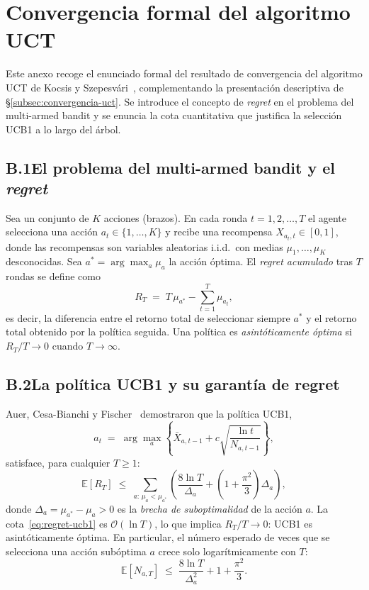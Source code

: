 \section{Convergencia formal del algoritmo UCT}
\label{anexo:kocsis}

Este anexo recoge el enunciado formal del resultado de convergencia del algoritmo UCT de Kocsis y Szepesvári~\cite{kocsis2006}, complementando la presentación descriptiva de §\ref{subsec:convergencia-uct}. Se introduce el concepto de \emph{regret} en el problema del multi-armed bandit y se enuncia la cota cuantitativa que justifica la selección UCB1 a lo largo del árbol.

\subsection*{B.1\quad El problema del multi-armed bandit y el \emph{regret}}

Sea un conjunto de $K$ acciones (brazos). En cada ronda $t = 1, 2, \ldots, T$ el agente selecciona una acción $a_t \in \{1, \ldots, K\}$ y recibe una recompensa $X_{a_t,t} \in [0,1]$, donde las recompensas son variables aleatorias i.i.d.\ con medias $\mu_1, \ldots, \mu_K$ desconocidas. Sea $a^* = \arg\max_a \mu_a$ la acción óptima. El \emph{regret acumulado} tras $T$ rondas se define como
\[
    R_T \;=\; T\,\mu_{a^*} - \sum_{t=1}^{T} \mu_{a_t},
\]
es decir, la diferencia entre el retorno total de seleccionar siempre $a^*$ y el retorno total obtenido por la política seguida. Una política es \emph{asintóticamente óptima} si $R_T/T \to 0$ cuando $T \to \infty$.

\subsection*{B.2\quad La política UCB1 y su garantía de regret}

Auer, Cesa-Bianchi y Fischer~\cite{auer2002} demostraron que la política UCB1,
\[
    a_t \;=\; \arg\max_{a} \left\{ \bar X_{a,t-1} + c\sqrt{\frac{\ln t}{N_{a,t-1}}} \right\},
\]
satisface, para cualquier $T \geq 1$:
\begin{equation}
    \mathbb{E}[R_T] \;\leq\; \sum_{a:\,\mu_a < \mu_{a^*}} \left(\frac{8\ln T}{\Delta_a} + \left(1 + \frac{\pi^2}{3}\right)\Delta_a\right),
    \label{eq:regret-ucb1}
\end{equation}
donde $\Delta_a = \mu_{a^*} - \mu_a > 0$ es la \emph{brecha de suboptimalidad} de la acción $a$. La cota~\eqref{eq:regret-ucb1} es $\mathcal{O}(\ln T)$, lo que implica $R_T/T \to 0$: UCB1 es asintóticamente óptima. En particular, el número esperado de veces que se selecciona una acción subóptima $a$ crece solo logarítmicamente con $T$:
\[
    \mathbb{E}[N_{a,T}] \;\leq\; \frac{8\ln T}{\Delta_a^2} + 1 + \frac{\pi^2}{3}.
\]

